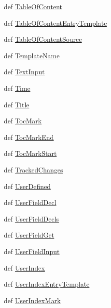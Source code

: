 \begin{DoxyCompactItemize}
\item 
def \hyperlink{namespaceodf_1_1text_a6ca7ea7a11e8105381384eeb72d6e9d4}{Table\+Of\+Content}
\item 
def \hyperlink{namespaceodf_1_1text_a94a402e740b82ffac0e4db3b5a31e43b}{Table\+Of\+Content\+Entry\+Template}
\item 
def \hyperlink{namespaceodf_1_1text_ab3d4223742b0d6587dbd849509da2ff5}{Table\+Of\+Content\+Source}
\item 
def \hyperlink{namespaceodf_1_1text_af8ef8cb8bdc9bfcd6d7d4822dfce2123}{Template\+Name}
\item 
def \hyperlink{namespaceodf_1_1text_ab634d1133e3e26106a0723cb60c9a067}{Text\+Input}
\item 
def \hyperlink{namespaceodf_1_1text_a3e3b08d3132ae85807b7489f2d5ba740}{Time}
\item 
def \hyperlink{namespaceodf_1_1text_a9e0d7f1b9c8f1b66d38dc80c6f004de5}{Title}
\item 
def \hyperlink{namespaceodf_1_1text_a65aa6760295604244ead887de6b6b611}{Toc\+Mark}
\item 
def \hyperlink{namespaceodf_1_1text_afc3500fa1c92307ed9006509727e218b}{Toc\+Mark\+End}
\item 
def \hyperlink{namespaceodf_1_1text_ac35985e4bfa47672c33ce859923a4e64}{Toc\+Mark\+Start}
\item 
def \hyperlink{namespaceodf_1_1text_a7b1eb2258f1da238c9289d0c8c904baf}{Tracked\+Changes}
\item 
def \hyperlink{namespaceodf_1_1text_a673800f8a223d22cb13fa189e41375ca}{User\+Defined}
\item 
def \hyperlink{namespaceodf_1_1text_a6124ccffbdc9a79e198fb18c9724b50d}{User\+Field\+Decl}
\item 
def \hyperlink{namespaceodf_1_1text_a1cf9a4dbc9427b193faa71a42293f90b}{User\+Field\+Decls}
\item 
def \hyperlink{namespaceodf_1_1text_a45610bdbdcfd6d65448ed4046f926638}{User\+Field\+Get}
\item 
def \hyperlink{namespaceodf_1_1text_aecd0ffec45628ec82c265c29f7fe0bd4}{User\+Field\+Input}
\item 
def \hyperlink{namespaceodf_1_1text_a8b3a970ba0c495c09e11ef882a81cd30}{User\+Index}
\item 
def \hyperlink{namespaceodf_1_1text_a561d54c57b671ec6c85e8e9013c6a719}{User\+Index\+Entry\+Template}
\item 
def \hyperlink{namespaceodf_1_1text_a422d63e4699fedee001a76856a18b185}{User\+Index\+Mark}
\item 

\end{DoxyCompactItemize}
